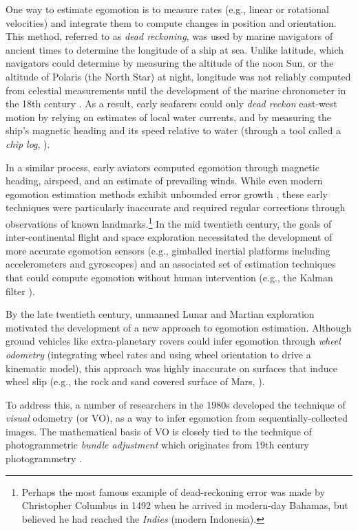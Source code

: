  One way to estimate egomotion is to measure rates (e.g., linear or rotational velocities) and integrate them to compute changes in position and orientation. This method, referred to as \textit{dead reckoning}, was used by marine navigators of ancient times to determine the longitude of a ship at sea. Unlike latitude, which navigators could determine by measuring the altitude of the noon Sun, or the altitude of Polaris (the North Star) at night, longitude was not reliably computed from celestial measurements until the development of the marine chronometer in the 18th century \citep{Barfoot2017-ri}. As a result, early seafarers could only \textit{dead reckon} east-west motion by relying on estimates of local water currents, and by measuring the ship's magnetic heading and its speed relative to water (through a tool called a \textit{chip log}, ). 

In a similar process, early aviators computed egomotion through magnetic heading, airspeed, and an estimate of prevailing winds. While even modern egomotion estimation methods exhibit unbounded error growth \citep{Olson2003-ax}, these early techniques were particularly inaccurate and required regular corrections through observations of known landmarks.\footnote{Perhaps the most famous example of dead-reckoning error was made by Christopher Columbus in 1492 when he arrived in modern-day Bahamas, but believed he had reached the \textit{Indies} (modern Indonesia).} In the mid twentieth century, the goals of inter-continental flight and space exploration necessitated the development of more accurate egomotion sensors (e.g., gimballed inertial platforms including accelerometers and gyroscopes) and an associated set of estimation techniques that could compute egomotion without human intervention (e.g., the Kalman filter \citep{Grewal2010-ts}).


By the late twentieth century, unmanned Lunar and Martian exploration motivated the development of a new approach to egomotion estimation. Although ground vehicles like extra-planetary rovers could infer egomotion through \textit{wheel odometry} (integrating wheel rates and using wheel orientation to drive a kinematic model), this approach was highly inaccurate on surfaces that induce wheel slip (e.g., the rock and sand covered surface of Mars, ). 

To address this, a number of researchers in the 1980s developed the technique of \textit{visual} odometry \citep{Scaramuzza2011-qr} (or VO), as a way to infer egomotion from sequentially-collected images. The mathematical basis of VO is closely tied to the technique of photogrammetric \textit{bundle adjustment} \citep{triggs_bundle_2000} which originates from 19th century photogrammetry \citep{albertz_look_2007}.

